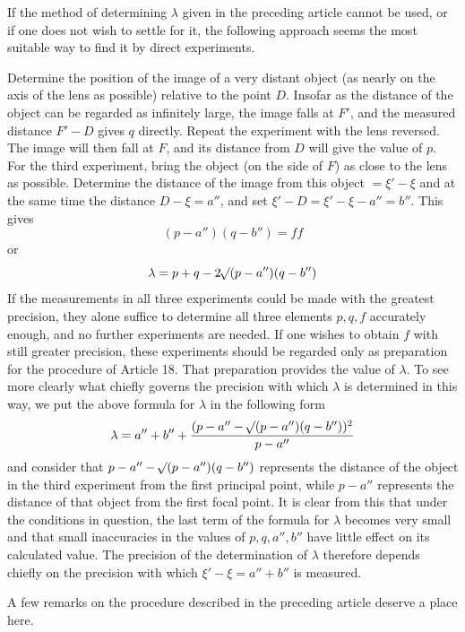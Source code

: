 If the method of determining $\lambda$ given in the preceding article cannot be used, or if one does not wish to settle for it, the following approach seems the most suitable way to find it by direct experiments.

Determine the position of the image of a very distant object (as nearly on the axis of the lens as possible) relative to the point $D$. Insofar as the distance of the object can be regarded as infinitely large, the image falls
at $F'$, and the measured distance $F'-D$ gives $q$ directly. Repeat the experiment with the lens reversed. The image will then fall at $F$, and its distance from $D$ will give the value of $p$. For the third experiment, bring the object (on the side of $F$) as close to the lens as possible. Determine the distance of the image from this object $=\xi'-\xi$ and at the same time the distance $D-\xi=a''$, and set $\xi'-D=\xi'-\xi-a''=b''$. This gives
\[
(p-a'')(q-b'')=ff
\]
or
\[
\lambda=p+q-2\mathord{{}^{}\!\surd}(p-a'')(q-b'')
\]
If the measurements in all three experiments could be made with the greatest precision, they alone suffice to determine all three elements $p,q,f$ accurately enough, and no further experiments are needed. If one wishes to obtain $f$ with still greater precision, these experiments should be regarded only as preparation for the procedure of Article 18. That preparation provides the value of $\lambda$. To see more clearly what chiefly governs the precision with which $\lambda$ is determined in this way, we put the above formula for $\lambda$ in the following form
\[
\lambda=a''+b''+\frac{(p-a''-\mathord{{}^{}\!\surd}(p-a'')(q-b''))^2}{p-a''}
\]
and consider that $p-a''-\mathord{{}^{}\!\surd}(p-a'')(q-b'')$ represents the distance of the object in the third experiment from the first principal point, while $p-a''$ represents the distance of that object from the first focal point. It is clear from this that under the conditions in question, the last term of the formula for $\lambda$ becomes very small and that small inaccuracies in the values of $p,q,a'',b''$ have little effect on its calculated value. The precision of the determination of $\lambda$ therefore depends chiefly on the precision with which $\xi'-\xi=a''+b''$ is measured.

A few remarks on the procedure described in the preceding article deserve a place here.

